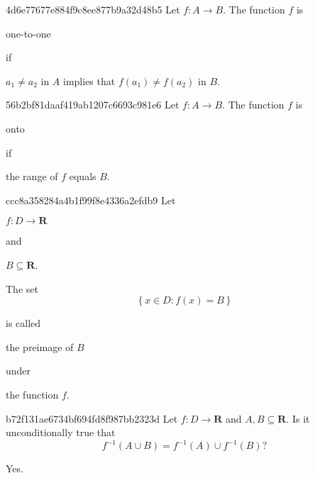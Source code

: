 \begin{note}{4d6e77677e884f9c8ee877b9a32d48b5}
    Let \({ f : A \to B }\). The function \({ f }\) is \begin{icloze}{2}one-to-one\end{icloze} if
    \begin{icloze}{1}
        \begin{center}
            \({ a_1 \neq a_2 }\) in \({ A }\) implies that \({ f(a_1) \neq f(a_2) }\) in \({ B }\).
        \end{center}
    \end{icloze}
\end{note}

\begin{note}{56b2bf81daaf419ab1207c6693c981e6}
    Let \({ f : A \to B }\). The function \({ f }\) is \begin{icloze}{2}onto\end{icloze} if
    \begin{icloze}{1}
        \begin{center}
            the range of \({ f }\) equals \({ B }\).
        \end{center}
    \end{icloze}
\end{note}

\begin{note}{ccc8a358284a4b1f99f8e4336a2efdb9}
    Let \begin{icloze}{4}\({ f : D \to \mathbf{R} }\)\end{icloze} and \begin{icloze}{3}\({ B \subseteq \mathbf{R} }\).\end{icloze}
    \begin{icloze}{2}
        The set
        \[
            \left\{ x \in D : f(x) = B \right\}
        \]
    \end{icloze}
    is called \begin{icloze}{1}the preimage of \({ B }\)\end{icloze} \begin{icloze}{5}under\end{icloze} the function \({ f }\).
\end{note}

\begin{note}{b72f131ae6734bf694fd8f987bb2323d}
    Let \({ f : D \to \mathbf{R} }\) and \({ A, B \subseteq \mathbf{R} }\).
    Is it unconditionally true that
    \[
        f^{-1}(A \cup B) = f^{-1}(A) \cup f^{-1}(B)?
    \]

    \begin{cloze}{1}
        Yes.
    \end{cloze}
\end{note}


